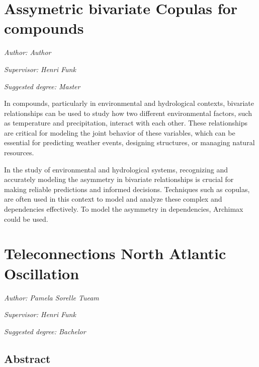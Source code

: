 \documentclass[
]{krantz}
\begin{document}
\chapter{Assymetric bivariate Copulas for compounds}\label{ac}

\emph{Author: Author}

\emph{Supervisor: Henri Funk}

\emph{Suggested degree: Master}

In compounds, particularly in environmental and hydrological contexts, bivariate relationships can be used to study how two different environmental factors, such as temperature and precipitation, interact with each other. These relationships are critical for modeling the joint behavior of these variables, which can be essential for predicting weather events, designing structures, or managing natural resources.

In the study of environmental and hydrological systems, recognizing and accurately modeling the asymmetry in bivariate relationships is crucial for making reliable predictions and informed decisions. Techniques such as copulas, are often used in this context to model and analyze these complex and dependencies effectively. To model the asymmetry in dependencies, Archimax could be used.

\citet{charpentier}
\citet{bacigal}

\chapter{Teleconnections North Atlantic Oscillation}\label{nao}

\emph{Author: Pamela Sorelle Tueam}

\emph{Supervisor: Henri Funk}

\emph{Suggested degree: Bachelor}

\section{Abstract}\label{abstract-1}
\end{document}
